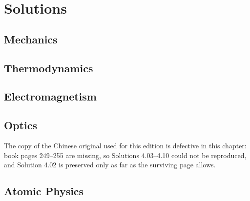 \chapter{Solutions}

\section{Mechanics}


\section{Thermodynamics}


\section{Electromagnetism}


\section{Optics}
\begin{note}
The copy of the Chinese original used for this edition is defective in this chapter:
book pages 249--255 are missing, so Solutions 4.03--4.10 could not be reproduced,
and Solution 4.02 is preserved only as far as the surviving page allows.
\end{note}


\section{Atomic Physics}

